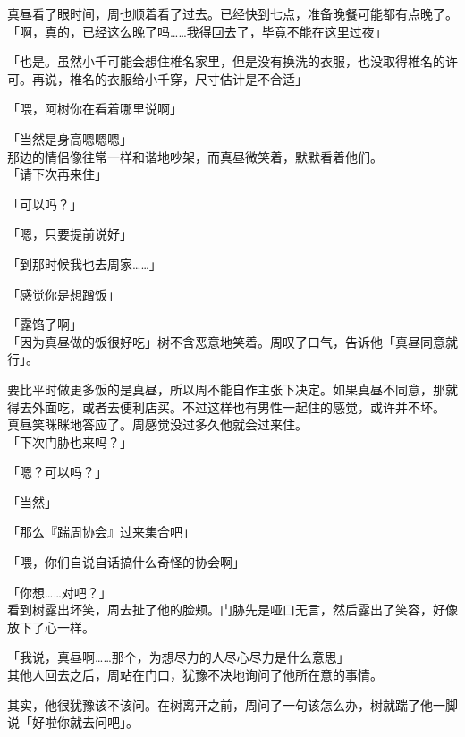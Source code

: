 真昼看了眼时间，周也顺着看了过去。已经快到七点，准备晚餐可能都有点晚了。\\

「啊，真的，已经这么晚了吗……我得回去了，毕竟不能在这里过夜」

「也是。虽然小千可能会想住椎名家里，但是没有换洗的衣服，也没取得椎名的许可。再说，椎名的衣服给小千穿，尺寸估计是不合适」

「喂，阿树你在看着哪里说啊」

「当然是身高嗯嗯嗯」\\

那边的情侣像往常一样和谐地吵架，而真昼微笑着，默默看着他们。\\

「请下次再来住」

「可以吗？」

「嗯，只要提前说好」

「到那时候我也去周家……」

「感觉你是想蹭饭」

「露馅了啊」\\

「因为真昼做的饭很好吃」树不含恶意地笑着。周叹了口气，告诉他「真昼同意就行」。

要比平时做更多饭的是真昼，所以周不能自作主张下决定。如果真昼不同意，那就得去外面吃，或者去便利店买。不过这样也有男性一起住的感觉，或许并不坏。\\

真昼笑眯眯地答应了。周感觉没过多久他就会过来住。\\

「下次门胁也来吗？」

「嗯？可以吗？」

「当然」

「那么『踹周协会』过来集合吧」

「喂，你们自说自话搞什么奇怪的协会啊」

「你想……对吧？」\\

看到树露出坏笑，周去扯了他的脸颊。门胁先是哑口无言，然后露出了笑容，好像放下了心一样。\\

\vspace{2\baselineskip}

「我说，真昼啊……那个，为想尽力的人尽心尽力是什么意思」\\

其他人回去之后，周站在门口，犹豫不决地询问了他所在意的事情。

其实，他很犹豫该不该问。在树离开之前，周问了一句该怎么办，树就踹了他一脚说「好啦你就去问吧」。

